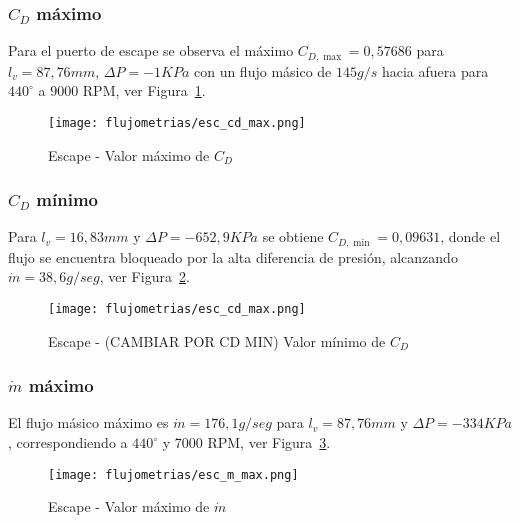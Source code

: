 \subsubsection{$C_{D}$ máximo}
%
Para el puerto de escape se observa el máximo $C_{D,\max}=0,57686$ para
$l_{v}=87,76 mm$, $\Delta P=-1 KPa$ con un flujo másico de $145 g/s$ hacia
afuera para $440^{\circ}$ a $9000$ RPM, ver Figura~\ref{fig:esc_cd_max}.

\begin{figure}[ht]
    \centering
    \texttt{[image: flujometrias/esc\_cd\_max.png]}
    \caption{Escape - Valor máximo de $C_{D}$}\label{fig:esc_cd_max}
\end{figure}

\subsubsection{$C_{D}$ mínimo}
%
Para $l_{v}=16,83 mm$ y $\Delta P=-652,9 KPa$ se obtiene $C_{D, \min}=0,09631$,
donde el flujo se encuentra bloqueado por la alta diferencia de presión,
alcanzando $\dot{m}=38,6 g/seg$, ver Figura~\ref{fig:esc_cd_min}.

\begin{figure}[ht]
    \centering
    \texttt{[image: flujometrias/esc\_cd\_max.png]}
    \caption{Escape - (CAMBIAR POR CD MIN) Valor mínimo de $C_{D}$}\label{fig:esc_cd_min}
\end{figure}

\subsubsection{$\dot{m}$ máximo}
%
El flujo másico máximo es $\dot{m}=176,1 g/seg$ para $l_{v}=87,76 mm$ y
$\Delta P=-334 KPa$, correspondiendo a $440^{\circ}$ y 7000 RPM,
ver Figura~\ref{fig:esc_m_max}.

\begin{figure}[ht]
    \centering
    \texttt{[image: flujometrias/esc\_m\_max.png]}
    \caption{Escape - Valor máximo de $\dot{m}$}\label{fig:esc_m_max}
\end{figure}



